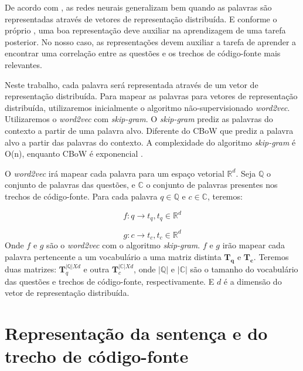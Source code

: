 De acordo com \cite{Goodfellow-et-al-2016:representation-learning}, as redes neurais generalizam bem quando as palavras são representadas através de vetores de representação distribuída. E conforme o próprio \cite{Goodfellow-et-al-2016:representation-learning}, uma boa representação deve auxiliar na aprendizagem de uma tarefa posterior. No nosso caso, as representações devem auxiliar a tarefa de aprender a encontrar uma correlação entre as questões e os trechos de código-fonte mais relevantes.

Neste trabalho, cada palavra será representada através de um vetor de representação distribuída. Para mapear as palavras para vetores de representação distribuída, utilizaremos inicialmente o algoritmo não-supervisionado \textit{word2vec}. Utilizaremos o \textit{word2vec} com \textit{skip-gram}. O \textit{skip-gram} prediz as palavras do contexto a partir de uma palavra alvo. Diferente do CBoW que prediz a palavra alvo a partir das palavras do contexto. A complexidade do algoritmo \textit{skip-gram} é O(n), enquanto CBoW é exponencial . 

O \textit{word2vec} irá mapear cada palavra para um espaço vetorial $\mathbb{R}^{d}$. Seja $\mathbb{Q}$ o conjunto de palavras das questões, e $\mathbb{C}$ o conjunto de palavras presentes nos trechos de código-fonte. Para cada palavra ${q} \in \mathbb{Q}$ e ${c} \in \mathbb{C}$, teremos:

\begin{equation}
    f: {q} \rightarrow t_{q}, t_{q} \in \mathbb{R}^{d}
\end{equation}

\begin{equation}
    g: {c} \rightarrow t_{c}, t_{c} \in \mathbb{R}^{d}
\end{equation}
Onde $f$ e $g$ são o \textit{word2vec} com o algoritmo \textit{skip-gram}. $f$ e $g$ irão mapear cada palavra pertencente a um vocabulário a uma matriz distinta $\bm{T_{q}}$ e $\bm{T_{c}}$.
Teremos duas matrizes: $\bm{T}_{q}^{|\mathbb{Q}| X d}$ e outra $\bm{T}_{c}^{|\mathbb{C}| X d}$, onde $|\mathbb{Q}|$ e $|\mathbb{C}|$ são o tamanho do vocabulário das questões e trechos de código-fonte, respectivamente. E $d$ é a dimensão do vetor de representação distribuída.

\section{Representação da sentença e do trecho de código-fonte}


